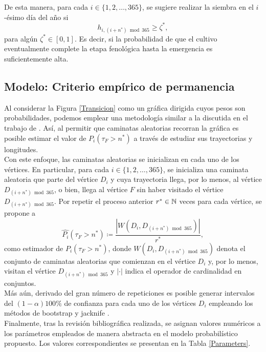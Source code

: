 De esta manera, para cada $i\in\{1,2,\ldots,365\}$, se sugiere realizar la siembra en el $i$-ésimo día del año si 
\begin{equation}
	h_{i,(i+n^*)\bmod 365} \geq \zeta^*,
\end{equation}
para algún $\zeta^*\in[0,1]$. Es decir, si la probabilidad de que el cultivo eventualmente complete la etapa fenológica hasta la emergencia es suficientemente alta.\\


\subsection{Modelo: Criterio empírico de permanencia}

Al considerar la Figura \ref{Transicion} como un gráfica dirigida cuyos pesos son probabilidades, podemos emplear una metodología similar a la discutida en el trabajo de \cite{deAndaJauregui_2021}. Así, al permitir que caminatas aleatorias recorran la gráfica es posible estimar el valor de $P_{i}(\tau_F>n^*)$ a través de estudiar sus trayectorias y longitudes.\\

Con este enfoque, las caminatas aleatorias se inicializan en cada uno de los vértices. En particular, para cada $i\in \{1,2,\ldots,365\}$, se inicializa una caminata aleatoria que parte del vértice $D_i$ y cuya trayectoria llega, por lo menos, al vértice $D_{(i+n^*)\bmod 365}$, o bien, llega al vértice $F$ sin haber visitado el vértice $D_{(i+n^*)\bmod 365}$. Por repetir el proceso anterior $r^*\in \mathbb{N}$ veces para cada vértice, se propone a \begin{equation}
	\widehat{P_{i}}(\tau_F>n^*)\coloneq \frac{|W(D_{i}, D_{(i+n^*)\bmod{365}})|}{r^*},
\end{equation} como estimador de $P_{i}(\tau_F>n^*)$, donde $W(D_{i}, D_{(i+n^*)\bmod{365}})$ denota el conjunto de caminatas aleatorias que comienzan en el vértice $D_{i}$ y, por lo menos, visitan el vértice $D_{(i+n^*)\bmod{365}}$ y $|\cdot|$ indica el operador de cardinalidad en conjuntos.\\

Más aún, derivado del gran número de repeticiones es posible generar intervalos del $(1-\alpha)100\%$ de confianza para cada uno de los vértices $D_i$ empleando los métodos de bootstrap y jacknife \cite[Capítulo 13]{Ramachandran_2009}.\\



Finalmente, tras la revisión bibliográfica realizada, se asignan valores numéricos a los parámetros empleados de manera abstracta en el modelo probabilístico propuesto. Los valores correspondientes se presentan en la Tabla \ref{Parameters}.\\ 

